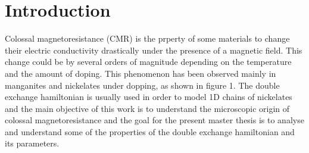 \documentclass[12pt,twoside]{report}
\begin{document}
	\thispagestyle{empty}
	\tableofcontents
		\thispagestyle{empty}
	\chapter*{Introduction}
	\setcounter{page}{1}
	\setlength{\parskip}{-1mm}
	
	Colossal magnetoresistance (CMR) is the prperty of some materials to change their
	electric conductivity drastically under the presence of a magnetic field.
	This change could be by several orders of magnitude depending on the
	temperature and the amount of doping. This phenomenon has been observed
	mainly in manganites and nickelates under dopping, as shown in figure 1. The
	double exchange hamiltonian is usually used in order to model 1D chains of
	nickelates and the main objective of this work is to understand the
	microscopic origin of colossal magnetoresistance and the goal for the
	present master thesis is to analyse and understand some of the properties of
	the double exchange hamiltonian and its parameters.
	 
\end{document}
